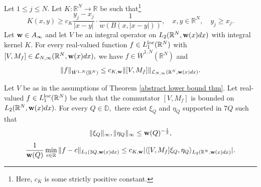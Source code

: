 \documentclass{amsart}
\begin{document}
\begin{theorem}\label{abstract lower bound thm}
Let $1\leq j\leq N.$ Let $K:\mathbb{R}^N\to\mathbb{R}$ be such that\footnote{Here, $c_K$ is some strictly positive constant.}
$$K(x,y)\geq c_K\frac{y_j-x_j}{|x-y|}\cdot\frac1{w(B(x,|x-y|))},\quad x,y\in\mathbb{R}^N,\quad y_j\geq x_j.$$
Let ${\bf w}\in A_{\infty}$ and let $V$ be an integral operator on $L_2(\mathbb{R}^N,{\bf w}(x)dx)$ with integral kernel $K.$ For every real-valued function $f\in L_1^{{\rm loc}}(\mathbb{R}^N)$ with $[V,M_f]\in\mathcal{L}_{N,\infty}(\mathbb{R}^N,{\bf w}(x)dx),$ we have $f\in\dot{W}^{1,N}(\mathbb{R}^N)$ and
$$\|f\|_{\dot{W}^{1,N}(\mathbb{R}^N)}\leq c_{K,{\bf w}}\|[V,M_f]\|_{\mathcal{L}_{N,\infty}(\mathbb{R}^N,{\bf w}(x)dx)}.$$
\end{theorem}

\begin{lemma}\label{improved zhijie lemma}
Let $V$ be as in the assumptions of Theorem \ref{abstract lower bound thm}.
Let real-valued $f\in L_1^{{\rm loc}}(\mathbb{R}^N)$ be such that
the commutator $[V,M_f]$ is bounded on
$L_2(\mathbb{R}^N,{\bf w}(x)dx).$
For every $Q\in\mathbb{D},$ there exist $\xi_Q$ and $\eta_Q$
supported in $7Q$ such that
$$\|\xi_Q\|_{\infty},\|\eta_Q\|_{\infty}\leq {\bf w}(Q)^{-\frac12},$$
$$\frac1{{\bf w}(Q)}\min_{c\in\mathbb{R}}\|f-c\|_{L_1(3Q,{\bf w}(x)dx)}\leq
c_{K,{\bf w}}|\langle[V,M_f]\xi_Q,\eta_Q\rangle_{L_2(\mathbb{R}^N,{\bf w}(x)dx)}|.$$
\end{lemma}
\end{document}
